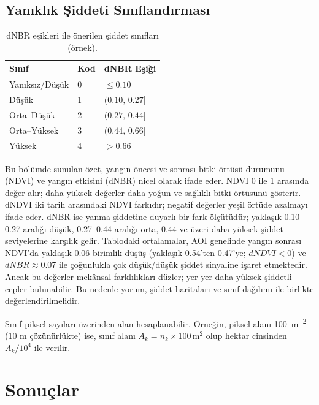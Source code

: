 \documentclass[11pt,a4paper]{article}
\begin{document}
\subsection{Yanıklık Şiddeti Sınıflandırması}
\begin{table}[h]
  \centering
  \begin{tabular}{@{}lll@{}}\toprule
  Sınıf & Kod & dNBR Eşiği \\\midrule
  Yanıksız/Düşük & 0 & $\leq 0.10$ \\
  Düşük & 1 & $(0.10,\,0.27]$ \\
  Orta--Düşük & 2 & $(0.27,\,0.44]$ \\
  Orta--Yüksek & 3 & $(0.44,\,0.66]$ \\
  Yüksek & 4 & $> 0.66$ \\\bottomrule
  \end{tabular}
  \caption{dNBR eşikleri ile önerilen şiddet sınıfları (örnek).}
\end{table}



Bu bölümde sunulan özet, yangın öncesi ve sonrası bitki örtüsü durumunu (NDVI) ve yangın etkisini (dNBR) nicel olarak ifade eder. NDVI 0 ile 1 arasında değer alır; daha yüksek değerler daha yoğun ve sağlıklı bitki örtüsünü gösterir. dNDVI iki tarih arasındaki NDVI farkıdır; negatif değerler yeşil örtüde azalmayı ifade eder. dNBR ise yanma şiddetine duyarlı bir fark ölçütüdür; yaklaşık 0.10--0.27 aralığı düşük, 0.27--0.44 aralığı orta, 0.44 ve üzeri daha yüksek şiddet seviyelerine karşılık gelir. Tablodaki ortalamalar, AOI genelinde yangın sonrası NDVI’da yaklaşık 0.06 birimlik düşüş (yaklaşık 0.54'ten 0.47'ye; \(dNDVI<0\)) ve \(dNBR \approx 0.07\) ile çoğunlukla çok düşük/düşük şiddet sinyaline işaret etmektedir. Ancak bu değerler mekânsal farklılıkları düzler; yer yer daha yüksek şiddetli cepler bulunabilir. Bu nedenle yorum, şiddet haritaları ve sınıf dağılımı ile birlikte değerlendirilmelidir.

Sınıf piksel sayıları üzerinden alan hesaplanabilir. Örneğin, piksel alanı \SI{100}{m\textsuperscript{2}}
(10 m çözünürlükte) ise, sınıf alanı $A_k = n_k \times 100\,\mathrm{m^2}$ olup
hektar cinsinden $A_k/10^4$ ile verilir.

\section{Sonuçlar}
\end{document}
